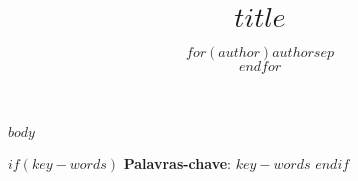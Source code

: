 \documentclass[a4paper, 11pt]{article}
\title{$title$}
\author{$for(author)$$author$$sep$ \\ $endfor$}
\date{}
\begin{document}
\maketitle
\thispagestyle{empty}

$body$

\vspace{1ex}
$if(key-words)$
\noindent \textbf{Palavras-chave}: $key-words$
$endif$
\end{document}
